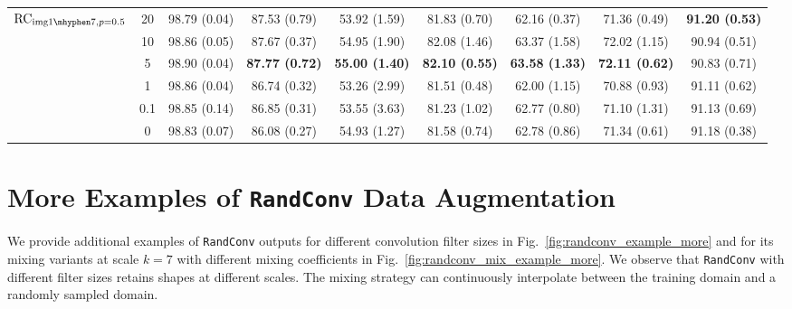 \documentclass{article} \usepackage{iclr2021_conference,times}
\newcommand{\RandConv}{\texttt{RandConv}}
\begin{document}
\begin{table}[htp]
\begin{tabular}{l|c|c|ccccc|c}
		\midrule
		\multirow{6}{*}{$\text{RC}_{\text{img}1\mhyphen7, p=0.5}$} & 20  & 98.79 \tiny(0.04) & 87.53 \tiny(0.79)          & 53.92 \tiny(1.59)          & 81.83 \tiny(0.70)          & 62.16 \tiny(0.37)          & 71.36 \tiny(0.49)          & \textbf{91.20 \tiny(0.53)}          \\
		& 10  & 98.86 \tiny(0.05) & 87.67 \tiny(0.37)          & 54.95 \tiny(1.90)          & 82.08 \tiny(1.46)          & 63.37 \tiny(1.58)          & 72.02 \tiny(1.15)          & 90.94 \tiny(0.51)          \\
		& 5   & 98.90 \tiny(0.04) & \textbf{87.77 \tiny(0.72)} & \textbf{55.00 \tiny(1.40)} & \textbf{82.10 \tiny(0.55)} & \textbf{63.58 \tiny(1.33)} & \textbf{72.11 \tiny(0.62)} & {90.83 \tiny(0.71)}          \\
		& 1   & 98.86 \tiny(0.04) & 86.74 \tiny(0.32)          & 53.26 \tiny(2.99)          & 81.51 \tiny(0.48)          & 62.00 \tiny(1.15)          & 70.88 \tiny(0.93)          & 91.11 \tiny(0.62)          \\
		& 0.1 & 98.85 \tiny(0.14) & 86.85 \tiny(0.31)          & 53.55 \tiny(3.63)          & 81.23 \tiny(1.02)          & 62.77 \tiny(0.80)          & 71.10 \tiny(1.31)          & 91.13 \tiny(0.69)          \\
		& 0   & 98.83 \tiny(0.07) & 86.08 \tiny(0.27)          & 54.93 \tiny(1.27)          & 81.58 \tiny(0.74)          & 62.78 \tiny(0.86)          & 71.34 \tiny(0.61)          & 91.18 \tiny(0.38)          \\
		
\bottomrule
	\end{tabular}
\end{table}
\newpage

\section{More Examples of {\RandConv} Data Augmentation}
\label{examples}
We provide additional examples of {\RandConv} outputs for different convolution filter sizes in Fig.~\ref{fig:randconv_example_more} and for its mixing variants at scale $k=7$ with different mixing coefficients in Fig.~\ref{fig:randconv_mix_example_more}. We observe that {\RandConv} with different filter sizes retains shapes at different scales. The mixing strategy can continuously interpolate between the training domain and a randomly sampled domain.  
\end{document}
